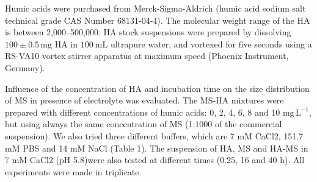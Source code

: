 \documentclass[journal=langd5,manuscript=article]{achemso}
\begin{document}
Humic acids were purchased from Merck-Sigma-Aldrich (humic acid sodium salt technical grade CAS Number 68131-04-4). The molecular weight range of the HA is between  2,000--500,000. HA stock suspensions were prepared by dissolving  $\mathrm{100 \pm 0.5\,mg}$ HA in $100~\mathrm{mL}$ ultrapure water, and vortexed for five seconds using a RS-VA10 vortex stirrer apparatus at maximum speed (Phoenix Instrument, Germany). 

Influence of the concentration of HA and incubation time  on the size  distribution of MS in presence of  electrolyte was evaluated. The MS-HA mixtures were prepared with different concentrations of humic acids: 0, 2, 4, 6, 8 and 10 $\mathrm{mg\,L^{-1}}$, but using always the same concentration of MS (1:1000 of the commercial suspension). We also tried  three different buffers, which are 7 mM CaCl2, 151.7 mM PBS and 14 mM NaCl (Table 1). The suspension of HA, MS and HA-MS in 7 mM CaCl2 (pH  5.8)were also tested at different times (0.25, 16 and 40 h). All experiments were made in triplicate.



\end{document}
